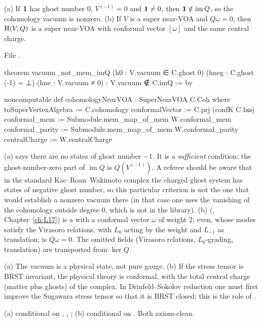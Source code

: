 \begin{theorem}\label{l04:thm:brstconf}
(a) If $\mathbf{1}$ has ghost number $0$, $V^{(-1)} = 0$ and $\mathbf{1}\ne0$, then $\mathbf{1}\notin
\operatorname{im}Q$, so the cohomology vacuum is nonzero. (b) If $V$ is a super near-VOA and
$Q\omega = 0$, then $\mathrm{H}(V,Q)$ is a super near-VOA with conformal vector $[\omega]$ and the same
central charge.
\end{theorem}
\noindent File .
\begin{leancode}
theorem vacuum_not_mem_imQ (h0 : V.vacuum ∈ C.ghost 0) (hneg : C.ghost (-1) = ⊥)
    (hne : V.vacuum ≠ 0) : V.vacuum ∉ C.imQ := by

noncomputable def cohomologyNearVOA : SuperNearVOA C.Coh where
  toSuperVertexAlgebra := C.cohomology
  conformalVector := C.prj (confK C hω)
  conformal_mem := Submodule.mem_map_of_mem W.conformal_mem
  conformal_parity := Submodule.mem_map_of_mem W.conformal_parity
  centralCharge := W.centralCharge
\end{leancode}
\begin{dictionary}
(a)  says there are no states of ghost number $-1$. It is a
\emph{sufficient} condition: the ghost-number-zero part of $\operatorname{im}Q$ is $Q(V^{(-1)})$. A
referee should be aware that in the standard Kac--Roan--Wakimoto complex the charged ghost system has
states of negative ghost number, so this particular criterion is not the one that would establish a
nonzero vacuum there (in that case one uses the vanishing of the cohomology outside degree $0$, which is
not in the library). (b)  (,
Chapter~\ref{ch:L17}) is a  with a conformal vector $\omega$ of weight $2$, even,
whose modes satisfy the Virasoro relations, with $L_0$ acting by the weight and $L_{-1}$ as translation;
 is $Q\omega = 0$. The omitted fields (Virasoro relations, $L_0$-grading, translation) are
transported from $\ker Q$.
\end{dictionary}
\begin{physics}
(a) The vacuum is a physical state, not pure gauge. (b) If the stress tensor is BRST invariant, the
physical theory is conformal, with the total central charge (matter plus ghosts) of the complex. In
Drinfeld--Sokolov reduction one must first improve the Sugawara stress tensor so that it is BRST
closed; this is the role of .
\end{physics}
\begin{status}
(a) conditional on , , ; (b) conditional on . Both axiom-clean.
\end{status}

